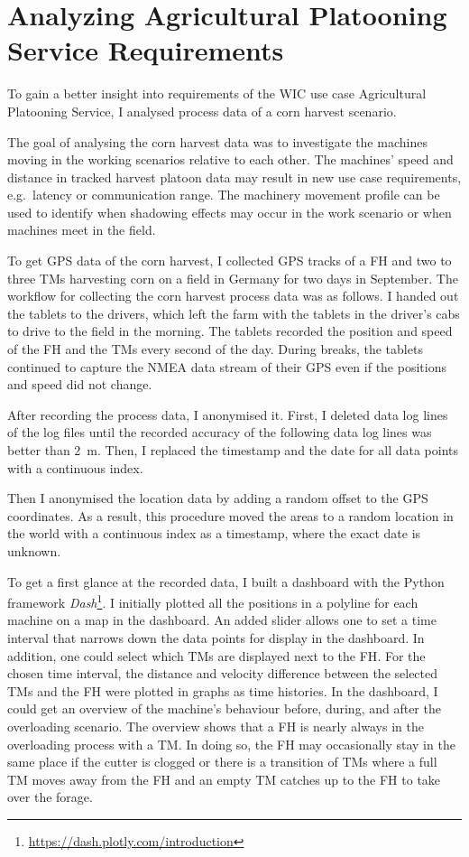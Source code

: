 \chapter{Analyzing Agricultural Platooning Service Requirements}
\label{chap:cornHarvestData}
To gain a better insight into requirements of the \ac{WIC} use case Agricultural Platooning Service,
I analysed process data of a corn harvest scenario.

The goal of analysing the corn harvest data was to investigate the machines moving in the working scenarios relative to each other.
The machines' speed and distance in tracked harvest platoon data may result in new use case requirements,
e.g.\ latency or communication range.
The machinery movement profile can be used to identify when shadowing effects may occur in the work scenario or
when machines meet in the field.

To get GPS data of the corn harvest,
I collected GPS tracks of a \ac{FH} and two to three \acp{TM} harvesting corn on a field in Germany for two days in September.
The workflow for collecting the corn harvest process data was as follows.
I handed out the tablets to the drivers, which left the farm with the tablets in the driver's cabs to drive to
the field in the morning.
The tablets recorded the position and speed of the \ac{FH} and the \acp{TM} every second of the day.
During breaks, the tablets continued to capture the NMEA data stream of their GPS even if the positions and speed did not change.

After recording the process data, I anonymised it.
First, I deleted data log lines of the log files until the recorded accuracy of the following data log lines was better than
\SI{2}{\metre}.
Then, I replaced the timestamp and the date for all data points with a continuous index.

Then I anonymised the location data by adding a random offset to the GPS coordinates.
As a result, this procedure moved the areas to a random location in the world with a continuous index as a timestamp,
where the exact date is unknown.

To get a first glance at the recorded data, I built a dashboard with the Python framework \textit{Dash}\footnote{\url{https://dash.plotly.com/introduction}}.
I initially plotted all the positions in a polyline for each machine
on a map in the dashboard.
An added slider allows one to set a time interval that narrows down the data points for
display in the dashboard.
In addition, one could select which \acp{TM} are displayed next to the \ac{FH}.
For the chosen time interval, the distance and velocity difference between the selected \acp{TM} and the \ac{FH} were
plotted in graphs as time histories.
In the dashboard, I could get an overview of the machine's behaviour
before, during, and after the overloading scenario.
The overview shows that a \ac{FH} is nearly always in the overloading process with a \ac{TM}.
In doing so, the \ac{FH} may occasionally stay in the same place if the cutter is clogged or there is a
transition of \acp{TM} where a full \ac{TM} moves away from the \ac{FH} and an empty \ac{TM} catches up to the
\ac{FH} to take over the forage.

